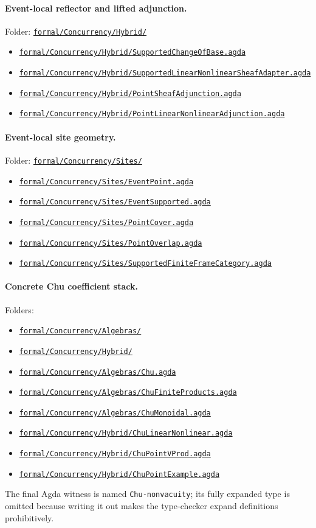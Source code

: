 \documentclass[11pt]{article}
\newcommand{\RepoURL}{https://codeberg.org/doc2cog/hoapa/src/branch/main}
\newcommand{\RepoDir}[1]{\href{\RepoURL/#1}{\nolinkurl{#1/}}}
\newcommand{\RepoFile}[1]{\href{\RepoURL/#1}{\nolinkurl{#1}}}
\begin{document}
\paragraph{Event-local reflector and lifted adjunction.}
Folder: \RepoDir{formal/Concurrency/Hybrid}
\begin{itemize}[leftmargin=1.4em,itemsep=2pt]
\item \RepoFile{formal/Concurrency/Hybrid/SupportedChangeOfBase.agda}
\item \RepoFile{formal/Concurrency/Hybrid/SupportedLinearNonlinearSheafAdapter.agda}
\item \RepoFile{formal/Concurrency/Hybrid/PointSheafAdjunction.agda}
\item \RepoFile{formal/Concurrency/Hybrid/PointLinearNonlinearAdjunction.agda}
\end{itemize}

\paragraph{Event-local site geometry.}
Folder: \RepoDir{formal/Concurrency/Sites}
\begin{itemize}[leftmargin=1.4em,itemsep=2pt]
\item \RepoFile{formal/Concurrency/Sites/EventPoint.agda}
\item \RepoFile{formal/Concurrency/Sites/EventSupported.agda}
\item \RepoFile{formal/Concurrency/Sites/PointCover.agda}
\item \RepoFile{formal/Concurrency/Sites/PointOverlap.agda}
\item \RepoFile{formal/Concurrency/Sites/SupportedFiniteFrameCategory.agda}
\end{itemize}

\paragraph{Concrete Chu coefficient stack.}
Folders:
\begin{itemize}[leftmargin=1.4em,itemsep=1pt]
\item \RepoDir{formal/Concurrency/Algebras}
\item \RepoDir{formal/Concurrency/Hybrid}
\end{itemize}
\begin{itemize}[leftmargin=1.4em,itemsep=2pt]
\item \RepoFile{formal/Concurrency/Algebras/Chu.agda}
\item \RepoFile{formal/Concurrency/Algebras/ChuFiniteProducts.agda}
\item \RepoFile{formal/Concurrency/Algebras/ChuMonoidal.agda}
\item \RepoFile{formal/Concurrency/Hybrid/ChuLinearNonlinear.agda}
\item \RepoFile{formal/Concurrency/Hybrid/ChuPointVProd.agda}
\item \RepoFile{formal/Concurrency/Hybrid/ChuPointExample.agda}
\end{itemize}
The final Agda witness is named \texttt{Chu-nonvacuity}; its fully expanded type
is omitted because writing it out makes the type-checker expand definitions
prohibitively.
\end{document}
